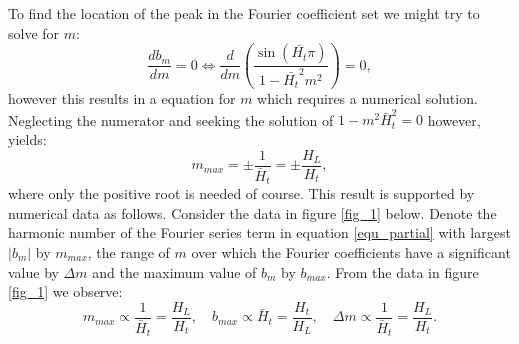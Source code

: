 \documentclass[12pt]{article}
\begin{document}
To find the location of the peak in the Fourier coefficient set we might try to solve for $m$:
%
\begin{equation}
\frac{db_m}{dm } = 0 \iff \frac{d}{dm} \left(  \frac{\sin \left( \bar{H_t} \pi \right) }{ 1 - \bar{H_t}^2 m^2 } \right) = 0, 
\end{equation}
% 
however this results in a equation for $m$ which requires a numerical solution. Neglecting the numerator and seeking the solution of $1 - m^2 \bar{H}_t^2 = 0$ however, yields:
%
\begin{equation}
m_{max} =  \pm \frac{1}{\bar{H}_t} = \pm \frac{H_L}{H_t} ,
\end{equation}
%
where only the positive root is needed of course. This result is supported by numerical data as follows. Consider the data in figure \ref{fig_1} below. 
Denote the harmonic number of the Fourier series term in equation \ref{equ_partial} with largest $|b_m|$ by $m_{max}$, the range of $m$ over which the 
Fourier coefficients have a significant value by $\Delta m$ and the maximum value of $b_m$ by $b_{max}$. From the data in figure \ref{fig_1} we observe:
%
\begin{equation}
m_{max} \propto \frac{1}{\bar{H}_t} = \frac{H_L}{H_t} , \quad b_{max} \propto \bar{H}_t = \frac{H_t}{H_L}, \quad \Delta m \propto \frac{1}{\bar{H}_t } = \frac{H_L}{H_t}.
\end{equation}
%
%
%
\end{document}
